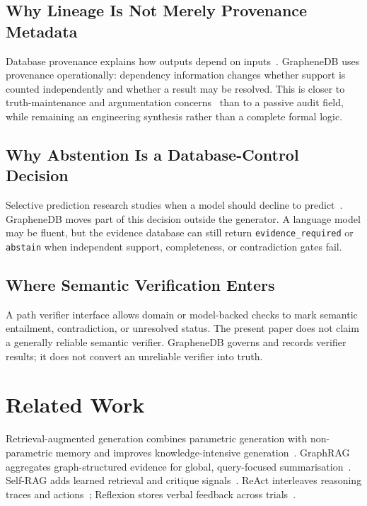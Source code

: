 \documentclass[10pt]{article}
\newcommand{\code}[1]{\texttt{#1}}
\begin{document}
\subsection{Why Lineage Is Not Merely Provenance Metadata}
Database provenance explains how outputs depend on inputs~\cite{buneman2001provenance,green2007provenance}. GrapheneDB uses provenance operationally: dependency information changes whether support is counted independently and whether a result may be resolved. This is closer to truth-maintenance and argumentation concerns~\cite{doyle1979tms,dung1995argumentation} than to a passive audit field, while remaining an engineering synthesis rather than a complete formal logic.

\subsection{Why Abstention Is a Database-Control Decision}
Selective prediction research studies when a model should decline to predict~\cite{elyaniv2010selective}. GrapheneDB moves part of this decision outside the generator. A language model may be fluent, but the evidence database can still return \code{evidence\_required} or \code{abstain} when independent support, completeness, or contradiction gates fail.

\subsection{Where Semantic Verification Enters}
A path verifier interface allows domain or model-backed checks to mark semantic entailment, contradiction, or unresolved status. The present paper does not claim a generally reliable semantic verifier. GrapheneDB governs and records verifier results; it does not convert an unreliable verifier into truth.

\section{Related Work}
Retrieval-augmented generation combines parametric generation with non-parametric memory and improves knowledge-intensive generation~\cite{lewis2020rag}. GraphRAG aggregates graph-structured evidence for global, query-focused summarisation~\cite{edge2024graphrag}. Self-RAG adds learned retrieval and critique signals~\cite{asai2023selfrag}. ReAct interleaves reasoning traces and actions~\cite{yao2022react}; Reflexion stores verbal feedback across trials~\cite{shinn2023reflexion}.
\end{document}
